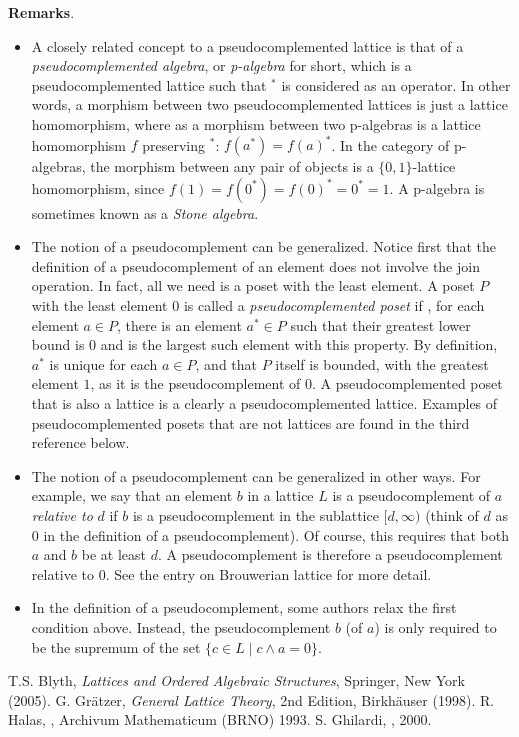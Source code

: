 \documentclass[12pt]{article}
\begin{document}
\textbf{Remarks}.
\begin{itemize}
\item
A closely related concept to a pseudocomplemented lattice is that of a \emph{pseudocomplemented algebra}, or \emph{p-algebra} for short, which is a pseudocomplemented lattice such that $^*$ is considered as an operator.  In other words, a morphism between two pseudocomplemented lattices is just a lattice homomorphism, where as a morphism between two p-algebras is a lattice homomorphism $f$ preserving $^*$: $f(a^*)=f(a)^*$.  In the category of p-algebras, the morphism between any pair of objects is a $\lbrace 0,1\rbrace$-lattice homomorphism, since $f(1)=f(0^*)=f(0)^*=0^*=1$.  A p-algebra is sometimes known as a \emph{Stone algebra}.
\item
The notion of a pseudocomplement can be generalized.  Notice first that the definition of a pseudocomplement of an element does not involve the join operation.  In fact, all we need is a poset with the least element.  A poset $P$ with the least element $0$ is called a \emph{pseudocomplemented poset} if , for each element $a\in P$, there is an element $a^*\in P$ such that their greatest lower bound is $0$ and is the largest such element with this property.  By definition, $a^*$ is unique for each $a\in P$, and that $P$ itself is bounded, with the greatest element $1$, as it is the pseudocomplement of $0$.  A pseudocomplemented poset that is also a lattice is a clearly a pseudocomplemented lattice.  Examples of pseudocomplemented posets that are not lattices are found in the third reference below.
\item
The notion of a pseudocomplement can be generalized in other ways.  For example, we say that an element $b$ in a lattice $L$ is a pseudocomplement of $a$ \emph{relative to} $d$ if $b$ is a pseudocomplement in the sublattice $[d,\infty)$ (think of $d$ as $0$ in the definition of a pseudocomplement).  Of course, this requires that both $a$ and $b$ be at least $d$.  A pseudocomplement is therefore a pseudocomplement relative to $0$.  See the entry on Brouwerian lattice for more detail.
\item
In the definition of a pseudocomplement, some authors relax the first condition above.  Instead, the pseudocomplement $b$ (of $a$) is only required to be the supremum of the set $\lbrace c\in L\mid c\wedge a=0\rbrace$.
\end{itemize}

\begin{thebibliography}{6}
 T.S. Blyth, {\em Lattices and Ordered Algebraic Structures}, Springer, New York (2005).
 G. Gr\"atzer, {\it General Lattice Theory}, 2nd Edition, Birkh\"auser (1998).
 R. Halas, {\it {}}, Archivum Mathematicum (BRNO) 1993.
 S. Ghilardi, {\it {}}, 2000.
\end{thebibliography}

\end{document}
